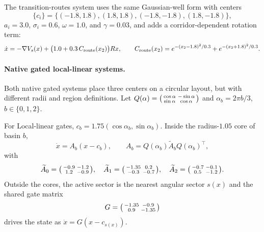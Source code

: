 The transition-routes system uses the same Gaussian-well form with centers
\[
  \{c_i\}
  =
  \{(-1.8,1.8),(1.8,1.8),(-1.8,-1.8),(1.8,-1.8)\},
\]
\(a_i=3.0\), \(\sigma_i=0.6\), \(\omega=1.0\), and \(\gamma=0.03\), and adds a
corridor-dependent rotation term:
\begin{equation}
  \dot x
  =
  -\nabla V_s(x)
  +
  \bigl(1.0+0.3\,C_{\rm route}(x_2)\bigr) R x,
  \qquad
  C_{\rm route}(x_2)
  =
  e^{-(x_2-1.8)^2/0.3}+e^{-(x_2+1.8)^2/0.3}.
  \label{eq:app_transition_routes}
\end{equation}

\paragraph{Native gated local-linear systems.}
Both native gated systems place three centers on a circular layout, but with
different radii and region definitions. Let
\(Q(\alpha)=\begin{psmallmatrix}\cos\alpha&-\sin\alpha\\
\sin\alpha&\cos\alpha\end{psmallmatrix}\) and
\(\alpha_b=2\pi b/3\), \(b\in\{0,1,2\}\).

For Local-linear gates, \(c_b=1.75(\cos\alpha_b,\sin\alpha_b)\).
Inside the radius-\(1.05\) core of basin \(b\),
\[
  \dot x=A_b(x-c_b),\qquad
  A_b=Q(\alpha_b)\widetilde A_b Q(\alpha_b)^\top,
\]
with
\[
\widetilde A_0=\begin{psmallmatrix}-0.9&-1.2\\1.2&-0.9\end{psmallmatrix},
\quad
\widetilde A_1=\begin{psmallmatrix}-1.35&0.2\\-0.3&-0.7\end{psmallmatrix},
\quad
\widetilde A_2=\begin{psmallmatrix}-0.7&-0.1\\0.5&-1.2\end{psmallmatrix}.
\]
Outside the cores, the active sector is the nearest angular sector \(s(x)\) and
the shared gate matrix
\[
  G=\begin{psmallmatrix}-1.35&-0.9\\0.9&-1.35\end{psmallmatrix}
\]
drives the state as \(\dot x=G(x-c_{s(x)})\).

